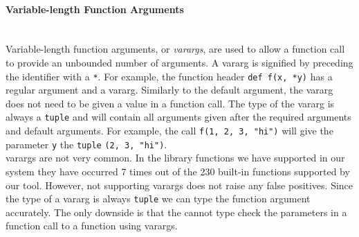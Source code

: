 \documentclass[12pt, titlepage]{article}
\begin{document}
\paragraph*{Variable-length Function Arguments}\mbox{} \\
Variable-length function arguments, or \textit{varargs}, are used to allow a function call to provide an unbounded number of arguments. A vararg is signified by preceding the identifier with a \texttt{*}. For example, the function header \texttt{def f(x, *y)} has a regular argument and a vararg. Similarly to the default argument, the vararg does not need to be given a value in a function call. The type of the vararg is always a \texttt{tuple} and will contain all arguments given after the required arguments and default arguments. For example, the call \texttt{f(1, 2, 3, "hi")} will give the parameter \texttt{y} the \texttt{tuple} \texttt{(2, 3, "hi")}. \\
\indent varargs are not very common. In the library functions we have supported in our system they have occurred 7 times out of the 230 built-in functions supported by our tool. However, not supporting varargs does not raise any false positives. Since the type of a vararg is always \texttt{tuple} we can type the function argument accurately. The only downside is that the cannot type check the parameters in a function call to a function using varargs. 
\end{document}
